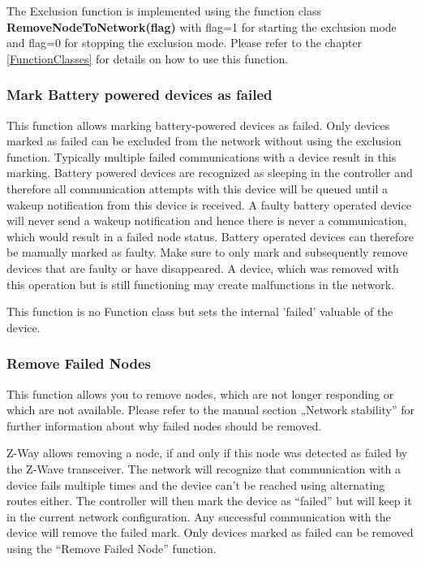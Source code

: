The Exclusion function is implemented using the function class {\bf RemoveNodeToNetwork(flag)} with flag=1 for starting the exclusion mode and flag=0 for stopping the 
exclusion mode. Please refer to the chapter \ref{FunctionClasses} for details on how to use this function.

\subsubsection{Mark Battery powered devices as failed}

This function allows marking battery-powered devices as failed. Only devices marked as failed can be excluded from the network without using the exclusion 
function. Typically multiple failed communications with a device result in this marking. Battery powered devices are recognized as sleeping in the controller 
and therefore all communication attempts with this device will be queued until a wakeup notification from this device is received. A faulty battery operated 
device will never send a wakeup notification and hence there is never a communication, which would result in a failed node status. Battery operated devices 
can therefore be manually marked as faulty.  Make sure to only mark  and subsequently remove  devices that are faulty or have disappeared. A device, which 
was removed with this operation but is still functioning may create malfunctions in the network.


This function is no Function class but sets the internal 'failed' valuable of the device.

\subsubsection{Remove Failed Nodes}

This function allows you to remove nodes, which are not longer responding or which are not available. Please refer to the manual section „Network stability” for further information about why failed nodes should be removed.

Z-Way allows removing a node, if and only if this node was detected as failed by the Z-Wave transceiver. The network will recognize that communication with a device fails multiple times and the device can’t be reached using alternating routes either. The controller will then mark the device as “failed” but will keep it in the current network configuration.  Any successful communication with the device will remove the failed mark. Only devices marked as failed can be removed using the “Remove Failed Node” function.

